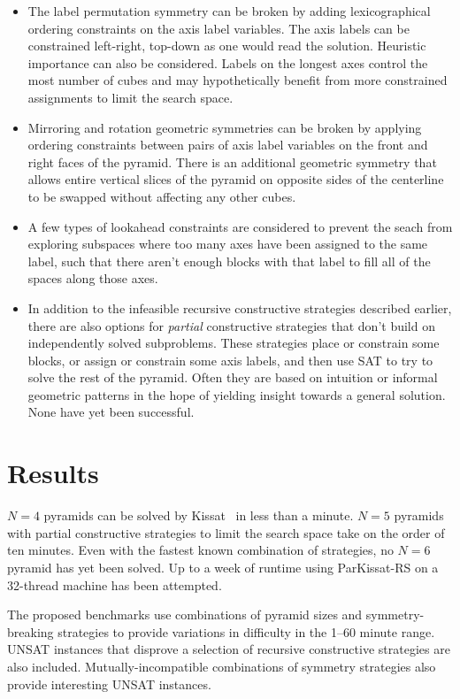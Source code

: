 \documentclass[conference]{IEEEtran}
\begin{document}
\begin{itemize}
\item The label permutation symmetry can be broken by adding lexicographical ordering constraints on the axis label variables.
The axis labels can be constrained left-right, top-down as one would read the solution.
Heuristic importance can also be considered.
Labels on the longest axes control the most number of cubes and may hypothetically benefit from more constrained assignments to limit the search space.
\item Mirroring and rotation geometric symmetries can be broken by applying ordering constraints between pairs of axis label
variables on the front and right faces of the pyramid.
There is an additional geometric symmetry that allows entire vertical slices of the pyramid on opposite sides of the centerline to be
swapped without affecting any other cubes.
\item A few types of lookahead constraints are considered to prevent the seach from exploring subspaces where too many axes have been
assigned to the same label, such that there aren't enough blocks with that label to fill all of the spaces along those axes.
\item In addition to the infeasible recursive constructive strategies described earlier, there are also options for \emph{partial} constructive strategies
that don't build on independently solved subproblems.
These strategies place or constrain some blocks, or assign or constrain some axis labels, and then use SAT to try to solve the rest of the pyramid.
Often they are based on intuition or informal geometric patterns in the hope of yielding insight towards a general solution.
None have yet been successful.
\end{itemize}

\section{Results}

$N=4$ pyramids can be solved by Kissat~\cite{k1} in less than a minute.
$N=5$ pyramids with partial constructive strategies to limit the search space take on the order of ten minutes.
Even with the fastest known combination of strategies, no $N=6$ pyramid has yet been solved.
Up to a week of runtime using ParKissat-RS on a 32-thread machine has been attempted.

The proposed benchmarks use combinations of pyramid sizes and symmetry-breaking strategies to provide variations in difficulty in the 1--60 minute range.
UNSAT instances that disprove a selection of recursive constructive strategies are also included.
Mutually-incompatible combinations of symmetry strategies also provide interesting UNSAT instances.
\end{document}
